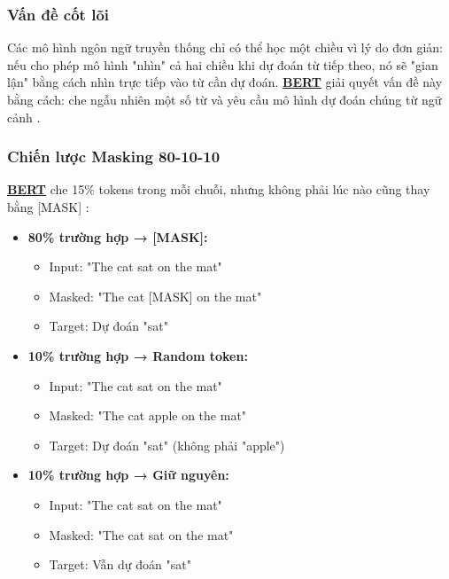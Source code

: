 \subsubsection{Vấn đề cốt lõi}
Các mô hình ngôn ngữ truyền thống chỉ có thể học một chiều vì lý do đơn giản: nếu cho phép mô hình "nhìn" cả hai chiều khi dự đoán từ tiếp theo, nó sẽ "gian lận" bằng cách nhìn trực tiếp vào từ cần dự đoán.
\hyperref[acro:bert]{\textbf{BERT}} giải quyết vấn đề này bằng cách: che ngẫu nhiên một số từ và yêu cầu mô hình dự đoán chúng từ ngữ cảnh \cite{devlin2018bert}.
\subsubsection{Chiến lược Masking 80-10-10}
\hyperref[acro:bert]{\textbf{BERT}} che 15\% tokens trong mỗi chuỗi, nhưng không phải lúc nào cũng thay bằng [MASK] \cite{devlin2018bert}:

\begin{itemize}
    \item \textbf{80\% trường hợp → [MASK]:} 
    \begin{itemize}
        \item Input: "The cat sat on the mat"
        \item Masked: "The cat [MASK] on the mat"
        \item Target: Dự đoán "sat"
    \end{itemize}
    
    \item \textbf{10\% trường hợp → Random token:}
    \begin{itemize}
        \item Input: "The cat sat on the mat"
        \item Masked: "The cat apple on the mat"
        \item Target: Dự đoán "sat" (không phải "apple")
    \end{itemize}
    
    \item \textbf{10\% trường hợp → Giữ nguyên:}
    \begin{itemize}
        \item Input: "The cat sat on the mat"
        \item Masked: "The cat sat on the mat"
        \item Target: Vẫn dự đoán "sat"
    \end{itemize}
\end{itemize}

